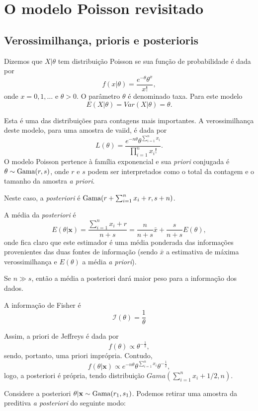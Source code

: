 \documentclass[
  letterpaper,
  DIV=11,
  numbers=noendperiod]{scrreprt}
\theoremstyle{plain}
\theoremstyle{definition}
\theoremstyle{definition}
\theoremstyle{remark}
\begin{document}

\chapter{O modelo Poisson revisitado}\label{o-modelo-poisson-revisitado}

\section{Verossimilhança, prioris e
posterioris}\label{verossimilhanuxe7a-prioris-e-posterioris}

Dizemos que \(X|\theta\) tem distribuição Poisson se sua função de
probabilidade é dada por \[f(x|\theta)=\frac{e^{-\theta}\theta^x}{x!},\]
onde \(x=0,1,\ldots\) e \(\theta>0\). O parâmetro \(\theta\) é
denominado taxa. Para este modelo \[E(X|\theta)=Var(X|\theta)=\theta.\]

Esta é uma das distribuições para contagens mais importantes. A
verossimilhança deste modelo, para uma amostra de vaiid, é dada por
\[L(\theta)=\frac{e^{-n\theta}\theta^{\sum_{i=1}^{n}x_i}}{\prod_{i=1}^{n}x_i!}.\]
O modelo Poisson pertence à família exponencial e sua \textit{priori}
conjugada é \(\theta\sim\hbox{Gama}(r,s)\), onde \(r\) e \(s\) podem ser
interpretados como o total da contagem e o tamanho da amostra
\textit{a priori}.

Neste caso, a \textit{posteriori} é
\(\hbox{Gama}(r+\sum_{i=1}^n x_i+r, s+n)\).

A média da \textit{posteriori} é
\[E(\theta|\mathbf{x})=\frac{\sum_{i=1}^{n}x_i+r}{n+s}=\frac{n}{n+s}\bar{x}+\frac{s}{n+s}E(\theta),\]
onde fica claro que este estimador é uma média ponderada das informações
provenientes das duas fontes de informação (sendo \(\bar{x}\) a
estimativa de máxima verossimilhança e \(E(\theta)\) a média
\textit{a priori}).

Se \(n\gg s\), então a média a posteriori dará maior peso para a
informação dos dados.

A informação de Fisher é \[\mathcal{I}(\theta)=\frac{1}{\theta}\]

Assim, a priori de Jeffreys é dada por
\[f(\theta)\propto \theta^{-\frac{1}{2}},\] sendo, portanto, uma priori
imprópria. Contudo,
\[f(\theta|\mathbf{x})\propto e^{-n\theta}\theta^{\sum_{i=1}^{n}x_i} \theta^{-\frac{1}{2}},\]
logo, a posteriori é própria, tendo distribuição
\(Gama(\sum_{i=1}^{n}x_i+1/2,n)\).

Considere a posteriori \(\theta|\mathbf{x}\sim\hbox{Gama}(r_1,s_1)\).
Podemos retirar uma amostra da preditiva \textit{a posteriori} do
seguinte modo:
\end{document}

